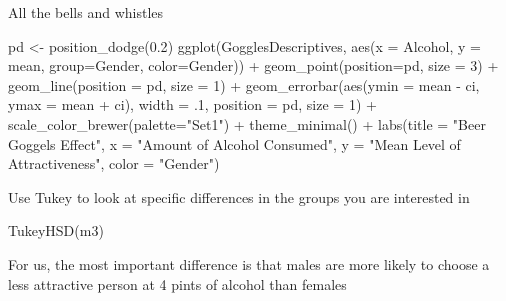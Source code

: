 \documentclass[
]{book}
\newenvironment{Shaded}{\begin{snugshade}}{\end{snugshade}}
\newcommand{\AttributeTok}[1]{\textcolor[rgb]{0.77,0.63,0.00}{#1}}
\newcommand{\DecValTok}[1]{\textcolor[rgb]{0.00,0.00,0.81}{#1}}
\newcommand{\FloatTok}[1]{\textcolor[rgb]{0.00,0.00,0.81}{#1}}
\newcommand{\FunctionTok}[1]{\textcolor[rgb]{0.00,0.00,0.00}{#1}}
\newcommand{\NormalTok}[1]{#1}
\newcommand{\OtherTok}[1]{\textcolor[rgb]{0.56,0.35,0.01}{#1}}
\newcommand{\SpecialCharTok}[1]{\textcolor[rgb]{0.00,0.00,0.00}{#1}}
\newcommand{\StringTok}[1]{\textcolor[rgb]{0.31,0.60,0.02}{#1}}
\begin{document}
All the bells and whistles

\begin{Shaded}
\begin{Highlighting}[]
\NormalTok{pd }\OtherTok{\textless{}{-}} \FunctionTok{position\_dodge}\NormalTok{(}\FloatTok{0.2}\NormalTok{)}
\FunctionTok{ggplot}\NormalTok{(GogglesDescriptives, }
       \FunctionTok{aes}\NormalTok{(}\AttributeTok{x =}\NormalTok{ Alcohol, }
           \AttributeTok{y =}\NormalTok{ mean, }
           \AttributeTok{group=}\NormalTok{Gender, }
           \AttributeTok{color=}\NormalTok{Gender)) }\SpecialCharTok{+}
  \FunctionTok{geom\_point}\NormalTok{(}\AttributeTok{position=}\NormalTok{pd, }
             \AttributeTok{size =} \DecValTok{3}\NormalTok{) }\SpecialCharTok{+}
  \FunctionTok{geom\_line}\NormalTok{(}\AttributeTok{position =}\NormalTok{ pd, }
            \AttributeTok{size =} \DecValTok{1}\NormalTok{) }\SpecialCharTok{+}
  \FunctionTok{geom\_errorbar}\NormalTok{(}\FunctionTok{aes}\NormalTok{(}\AttributeTok{ymin =}\NormalTok{ mean }\SpecialCharTok{{-}}\NormalTok{ ci, }
                    \AttributeTok{ymax =}\NormalTok{ mean }\SpecialCharTok{+}\NormalTok{ ci), }
                \AttributeTok{width =}\NormalTok{ .}\DecValTok{1}\NormalTok{, }
                \AttributeTok{position =}\NormalTok{ pd, }
                \AttributeTok{size =} \DecValTok{1}\NormalTok{) }\SpecialCharTok{+}
  \FunctionTok{scale\_color\_brewer}\NormalTok{(}\AttributeTok{palette=}\StringTok{"Set1"}\NormalTok{) }\SpecialCharTok{+}
  \FunctionTok{theme\_minimal}\NormalTok{() }\SpecialCharTok{+}
  \FunctionTok{labs}\NormalTok{(}\AttributeTok{title =} \StringTok{"Beer Goggels Effect"}\NormalTok{,}
       \AttributeTok{x =} \StringTok{"Amount of Alcohol Consumed"}\NormalTok{, }
       \AttributeTok{y =} \StringTok{"Mean Level of Attractiveness"}\NormalTok{,}
       \AttributeTok{color =} \StringTok{"Gender"}\NormalTok{)}
\end{Highlighting}
\end{Shaded}

Use Tukey to look at specific differences in the groups you are interested in

\begin{Shaded}
\begin{Highlighting}[]
\FunctionTok{TukeyHSD}\NormalTok{(m3)}
\end{Highlighting}
\end{Shaded}

For us, the most important difference is that males are more likely to choose
a less attractive person at 4 pints of alcohol than females
\end{document}
